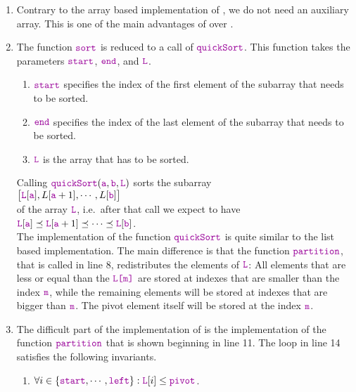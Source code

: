 \begin{enumerate}
\item Contrary to the array based implementation of , we do not need an auxiliary
      array.  This is one of the main advantages of  over .
\item The function $\mytt{sort}$ is reduced to a call of $\mytt{quickSort}$.  This function
      takes the parameters $\mytt{start}$, $\mytt{end}$, and $\mytt{L}$.  
      \begin{enumerate}
      \item $\mytt{start}$ specifies the index of the first element of the subarray that needs to be
            sorted.
      \item $\mytt{end}$ specifies the index of the last element of the subarray that needs to be
            sorted. 
      \item $\mytt{L}$ is the array that has to be sorted.
      \end{enumerate}
      Calling $\mytt{quickSort}(\mytt{a}, \mytt{b}, \mytt{L})$ sorts the subarray \\[0.2cm]
      \hspace*{1.3cm} 
      $\bigl[\mytt{L}[\mytt{a}], L[\mytt{a}+1], \cdots, L[\mytt{b}]\bigr]$
      \\[0.2cm]
      of the array $\mytt{L}$, i.e.~after that call we expect to have\\[0.2cm]
      \hspace*{1.3cm} 
      $\mytt{L}[\mytt{a}] \preceq \mytt{L}[\mytt{a}+1] \preceq \cdots \preceq \mytt{L}[\mytt{b}]$.
      \\[0.2cm]
      The implementation of the function $\mytt{quickSort}$
      is quite similar to the list based implementation.  The main difference is that the function
      $\mytt{partition}$, that is called in line 8, redistributes the elements of $\mytt{L}$:
      All elements that are less or equal than the  $\mytt{L[m]}$
      are stored at indexes that are smaller than the index $\mytt{m}$, while the remaining elements will 
      be stored at indexes that are bigger than $\mytt{m}$.  The pivot element itself will be stored at the
      index $\mytt{m}$. 
\item The difficult part of the implementation of  is the implementation of the
      function $\mytt{partition}$ that is shown beginning in line 11.
      The  loop in line 14 satisfies the following invariants.
      \begin{enumerate}
      \item $\forall i \in \{ \mytt{start}, \cdots, \mytt{left} \} : \mytt{L}[i] \leq \mytt{pivot}$.


\end{enumerate}
\end{enumerate}
